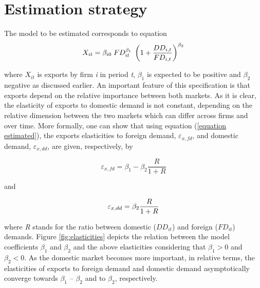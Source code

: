 \documentclass[a4paper,12pt]{article}
\begin{document}
\FloatBarrier




\section{Estimation strategy}\label{sec:est:strategy}

The model to be estimated corresponds to equation
\begin{equation}
X_{it}=\beta_{i0}\;FD_{it}^{\beta_{1}}\;\left(1+\dfrac{DD_{i,t}}{FD_{i,t}}%
\right)^{\beta_{2}}  \label{equation estimated}
\bigskip 
\end{equation}

\noindent where $X_{it}$ is exports by firm \textit{i} in period \textit{t}, $\beta_{1}$ is expected to be positive and $\beta_{2}$
negative as discussed earlier. An important feature of this specification is that exports depend on the relative importance between both markets. As it is clear, the elasticity of exports to domestic demand is not constant, depending on the relative dimension between the two markets which can differ across firms and over time. More formally, one can show that using equation (\ref{equation estimated}), the exports elasticities to foreign demand, $\varepsilon_{x,fd}$, and domestic demand, $\varepsilon_{x,dd}$, are given, respectively, by

\begin{equation}
\varepsilon_{x,fd} = \beta_{1} - \beta_{2} \dfrac{R}{1+R}\label{eq:elast:fd}
\end{equation}

\noindent and

\begin{equation}
	\varepsilon_{x,dd} = \beta_{2} \dfrac{R}{1+R}\label{eq:elast:dd}
\bigskip
\end{equation}

\noindent where \textit{R} stands for the ratio between domestic ($DD_{it}$) and foreign ($FD_{it}$) demands. Figure \ref{fig:elasticities} depicts the relation between the model coefficients $\beta_{1}$ and $\beta_{2}$ and the above elasticities considering that $\beta _{1} > 0$ and $\beta _{2} < 0$. As the domestic market becomes more important, in relative terms, the elasticities of exports to foreign demand and domestic demand asymptotically converge towards $\beta_{1}$ -- $\beta_{2}$ and to $\beta_{2}$, respectively.
\end{document}
